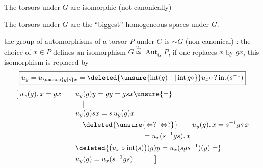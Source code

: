 
The torsors under $G$ are isomorphic (not canonically)

The torsors under $G$ are the ``biggest'' homogeneous spaces under $G$.

the group of automorphisms of a torsor $P$ under $G$ is $\sim G$ (non-canonical) : the choice of $x\in P$ defines an isomorphism $G\overset{u_x}{\simeq}\operatorname{Aut}_{G}P$, if one replaces $x$ by $gx$, this isomorphism is replaced by
\[
\boxed{u_y=u_{\unsure{g|s}x}=\deleted{\unsure{\operatorname{int}(g)\circ|\operatorname{int}g\circ}}u_x\circ\,?\operatorname{int}(s^{-1})}
\]
{\small
\[
\begin{aligned}
\bigl[\,u_x(g).\,x=gx\qquad &u_y(g)y=gy=gsx\unsure{=}\\
&\quad\Vert\\[-3pt]
&u_y(g)sx=s\,u_y(g)x
\\
&\hspace{1em}\deleted{\unsure{\Leftarrow ?|\Leftrightarrow ?}} \qquad u_y(g).\,x=s^{-1}gs\,x\\
&\hspace{9.4em}=u_x(s^{-1}gs).\,x\\
&\deleted{\bigl(u_x\circ\operatorname{int}(s)\bigr)(g)y=u_x(sgs^{-1})(y)=}\\
&u_y(g)=u_x(s^{-1}gs)\hspace{3em}\bigr]
\end{aligned}
\]}
